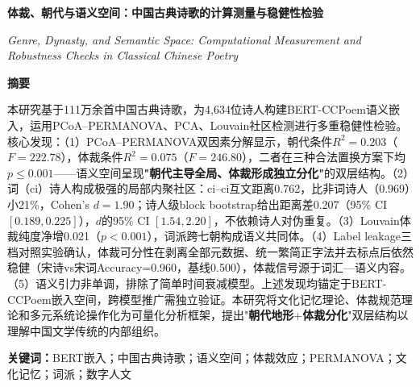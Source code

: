 \documentclass[12pt,a4paper]{article}
\numberwithin{equation}{section}
\begin{document}
\begin{center}
  \vspace*{0.5cm}
  {\bfseries\fontsize{14}{20}\selectfont 体裁、朝代与语义空间：中国古典诗歌的计算测量与稳健性检验\par}
  \vspace{0.5em}
  {\fontsize{11}{16}\selectfont\itshape Genre, Dynasty, and Semantic Space: Computational Measurement and Robustness Checks in Classical Chinese Poetry\par}
  \vspace{0.8em}

  {\bfseries\fontsize{14}{20}\selectfont 摘\quad 要\par}
  \vspace{0.4em}
  \parbox{0.92\linewidth}{\fontsize{10.5}{14}\selectfont%
    本研究基于111万余首中国古典诗歌，为4,634位诗人构建BERT-CCPoem语义嵌入，运用PCoA--PERMANOVA、PCA、Louvain社区检测进行多重稳健性检验。核心发现：（1）PCoA--PERMANOVA双因素分解显示，朝代条件$R^{2}=0.203$（$F=222.78$），体裁条件$R^{2}=0.075$（$F=246.80$），二者在三种合法置换方案下均$p\leq0.001$——语义空间呈现\textbf{"朝代主导全局、体裁形成独立分化"}的双层结构。（2）词（ci）诗人构成极强的局部内聚社区：ci--ci互文距离0.762，比非词诗人（0.969）小21\%，Cohen's $d=1.90$；诗人级block bootstrap给出距离差0.207（95\% CI $[0.189,0.225]$），$d$的95\% CI $[1.54,2.20]$，不依赖诗人对伪重复。（3）Louvain体裁纯度净增0.021（$p<0.001$），词派跨七朝构成语义共同体。（4）Label leakage三档对照实验确认，体裁可分性在剥离全部元数据、统一繁简正字法并去标点后依然稳健（宋诗vs宋词Accuracy=0.960，基线0.500），体裁信号源于词汇—语义内容。（5）语义引力非单调，排除了简单时间衰减模型。上述发现均锚定于BERT-CCPoem嵌入空间，跨模型推广需独立验证。本研究将文化记忆理论、体裁规范理论和多元系统论操作化为可量化分析框架，提出"\textbf{朝代地形}+\textbf{体裁分化}"双层结构以理解中国文学传统的内部组织。\par}
  \vspace{0.5em}

  {\bfseries\fontsize{10.5}{14}\selectfont 关键词：}\fontsize{10.5}{14}\selectfont BERT嵌入；中国古典诗歌；语义空间；体裁效应；PERMANOVA；文化记忆；词派；数字人文
  \vspace{0.8em}

\end{center}
\newpage
\end{document}
